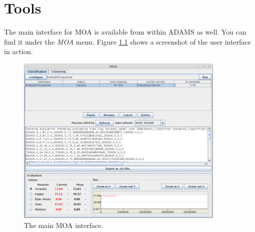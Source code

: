 \documentclass[a4paper]{book}
\begin{document}
\chapter{Tools}
The main interface for MOA is available from within ADAMS as well. You can
find it under the \textit{MOA} menu. Figure \ref{moa-gui} shows a screenshot
of the user interface in action.
\begin{figure}[htb]
  \centering
  \includegraphics[width=10.0cm]{images/moa-gui.png}
  \caption{The main MOA interface.}
  \label{moa-gui}
\end{figure}



\end{document}
